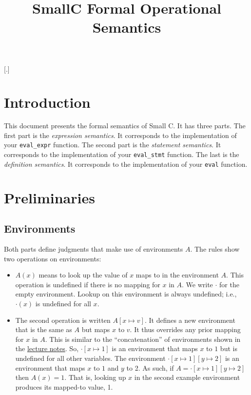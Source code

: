 \documentclass[10pt]{article}
\begin{document}
\title{%
  SmallC Formal Operational Semantics}

\maketitle

\newcommand{\config}[2][A]{{#1};{#2}}
[.]
\titlespacing*{\subsection}{\parindent}{1ex}{1em}

\section{Introduction}

This document presents the formal semantics of Small C. It has three
parts. The first part is the \emph{expression semantics}. It
corresponds to the implementation of your \texttt{eval\_expr}
function. The second part is the \emph{statement semantics}. It
corresponds to the implementation of your \texttt{eval\_stmt}
function. The last is the \emph{definition semantics}. It corresponds 
to the implementation of your \texttt{eval} function.

\section{Preliminaries}

\subsection{Environments}

Both parts define judgments that make use of environments $A$. The
rules show two operations on environments:
\begin{itemize}
\item $A(x)$ means to look up the value of $x$ maps to in the
  environment $A$. This operation is undefined if there is no mapping
  for $x$ in $A$.  We write $\cdot$ for the empty environment. Lookup
  on this environment is always undefined; i.e., $\cdot(x)$ is
  undefined for all $x$.
\item The second operation is written $A[ x \mapsto v ]$. It defines a
  new environment that is the same as $A$ but maps $x$ to $v$. It thus
  overrides any prior mapping for $x$ in $A$. This is similar to the
  ``concatenation'' of environments shown in the \href{https://bakalian.cs.umd.edu/330/slides}{lecture notes}. 
  So, $\cdot[ x \mapsto 1 ]$ is an environment that maps $x$
  to $1$ but is undefined for all other variables. The environment
  $\cdot[ x \mapsto 1][y \mapsto 2]$ is an environment that maps $x$
  to $1$ and $y$ to 2. As such, if
  $A = \cdot[ x \mapsto 1][y \mapsto 2]$ then $A(x) = 1$. That is,
  looking up $x$ in the second example environment produces its
  mapped-to value, 1.
\end{itemize}
\end{document}
